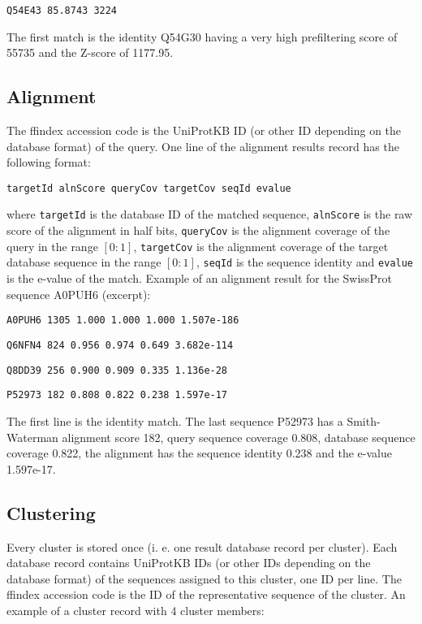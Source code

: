 \documentclass[11pt,a4paper]{report}
\begin{document}
\texttt{\footnotesize Q54E43 85.8743 3224}{\footnotesize \par}

The first match is the identity Q54G30 having a very high prefiltering
score of 55735 and the Z-score of 1177.95. 


\subsection{Alignment}

The ffindex accession code is the UniProtKB ID (or other ID depending
on the database format) of the query. One line of the alignment results
record has the following format:

\texttt{targetId alnScore queryCov targetCov seqId evalue}

where \texttt{targetId} is the database ID of the matched sequence,
\texttt{alnScore} is the raw score of the alignment in half bits,
\texttt{queryCov} is the alignment coverage of the query in the range
$[0:1]$, \texttt{targetCov} is the alignment coverage of the target
database sequence in the range $[0:1]$, \texttt{seqId} is the sequence
identity and \texttt{evalue} is the e-value of the match. Example
of an alignment result for the SwissProt sequence A0PUH6 (excerpt):

\texttt{\footnotesize A0PUH6 1305 1.000 1.000 1.000 1.507e-186}{\footnotesize \par}

\texttt{\footnotesize Q6NFN4 824 0.956 0.974 0.649 3.682e-114}{\footnotesize \par}

\texttt{\footnotesize Q8DD39 256 0.900 0.909 0.335 1.136e-28}{\footnotesize \par}

\texttt{\footnotesize P52973 182 0.808 0.822 0.238 1.597e-17}{\footnotesize \par}

The first line is the identity match. The last sequence P52973 has
a Smith-Waterman alignment score 182, query sequence coverage 0.808,
database sequence coverage 0.822, the alignment has the sequence identity
0.238 and the e-value 1.597e-17.


\subsection{Clustering}

Every cluster is stored once (i. e. one result database record per
cluster). Each database record contains UniProtKB IDs (or other IDs
depending on the database format) of the sequences assigned to this
cluster, one ID per line. The ffindex accession code is the ID of
the representative sequence of the cluster. An example of a cluster
record with 4 cluster members:
\end{document}
